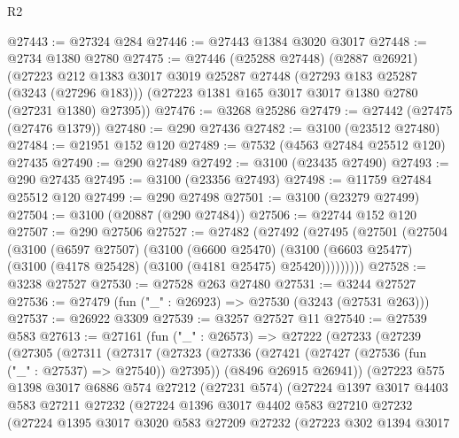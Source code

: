 \begin{lexlean}{R2}
\begin{coremodule}
@27443 := @27324 @284
@27446 := @27443 @1384 @3020 @3017
@27448 := @2734 @1380 @2780
@27475 := @27446
    (@25288 @27448)
    (@2887 @26921)
    (@27223
      @212
      @1383
      @3017
      @3019
      @25287
      @27448
      (@27293 @183 @25287 (@3243 (@27296 @183)))
      (@27223 @1381 @165 @3017 @3017 @1380 @2780 (@27231 @1380) @27395))
@27476 := @3268 @25286
@27479 := @27442 (@27475 (@27476 @1379))
@27480 := @290 @27436
@27482 := @3100 (@23512 @27480)
@27484 := @21951 @152 @120
@27489 := @7532 (@4563 @27484 @25512 @120) @27435
@27490 := @290 @27489
@27492 := @3100 (@23435 @27490)
@27493 := @290 @27435
@27495 := @3100 (@23356 @27493)
@27498 := @11759 @27484 @25512 @120
@27499 := @290 @27498
@27501 := @3100 (@23279 @27499)
@27504 := @3100 (@20887 (@290 @27484))
@27506 := @22744 @152 @120
@27507 := @290 @27506
@27527 := @27482
    (@27492
      (@27495
        (@27501
          (@27504
            (@3100
              (@6597 @27507)
              (@3100
                (@6600 @25470)
                (@3100 (@6603 @25477) (@3100 (@4178 @25428) (@3100 (@4181 @25475) @25420)))))))))
@27528 := @3238 @27527
@27530 := @27528 @263 @27480
@27531 := @3244 @27527
@27536 := @27479 (fun ("_" : @26923) => @27530 (@3243 (@27531 @263)))
@27537 := @26922 @3309
@27539 := @3257 @27527 @11
@27540 := @27539 @583
@27613 := @27161
    (fun ("_" : @26573) =>
    @27222
      (@27233
        (@27239
          (@27305
            (@27311
              (@27317
                (@27323
                  (@27336
                    (@27421 (@27427 (@27536 (fun ("_" : @27537) => @27540)) @27395))
                    (@8496 @26915 @26941))
                  (@27223
                    @575
                    @1398
                    @3017
                    @6886
                    @574
                    @27212
                    (@27231 @574)
                    (@27224
                      @1397
                      @3017
                      @4403
                      @583
                      @27211
                      @27232
                      (@27224
                        @1396
                        @3017
                        @4402
                        @583
                        @27210
                        @27232
                        (@27224
                          @1395
                          @3017
                          @3020
                          @583
                          @27209
                          @27232
                          (@27223
                            @302
                            @1394
                            @3017

\end{coremodule}
\end{lexlean}
